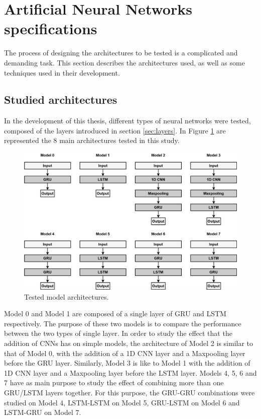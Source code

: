 \section{Artificial Neural Networks specifications} \label{chap4:anns}

The process of designing the architectures to be tested is a complicated and demanding task. This section describes the architectures used, as well as some techniques used in their development.

\subsection{Studied architectures}\label{sec:arq}
In the development of this thesis, different types of neural networks were tested, composed of the layers introduced in section \ref{sec:layers}. In Figure \ref{models} are represented the 8 main architectures tested in this study.
\begin{figure}[h!]
    \centering
    \begin{center}
    \includegraphics[width=1\textwidth]{Images/models.png}
    \caption{Tested model architectures.}
    \label{models}
    \end{center}
\end{figure}


Model 0 and Model 1 are composed of a single layer of \ac{GRU} and \ac{LSTM} respectively. The purpose of these two models is to compare the performance between the two types of single layer. In order to study the effect that the addition of \ac{CNN}s has on simple models, the architecture of Model 2 is similar to that of Model 0, with the addition of a \ac{1D CNN} layer and a Maxpooling layer before the \ac{GRU} layer. Similarly, Model 3 is like to Model 1 with the addition of \ac{1D CNN} layer and a Maxpooling layer before the \ac{LSTM} layer. Models 4, 5, 6 and 7 have as main purpose to study the effect of combining more than one \ac{GRU}/\ac{LSTM} layers together. For this purpose, the \ac{GRU}-\ac{GRU} combinations were studied on Model 4, \ac{LSTM}-\ac{LSTM} on Model 5, \ac{GRU}-\ac{LSTM} on Model 6 and \ac{LSTM}-\ac{GRU} on Model 7.


